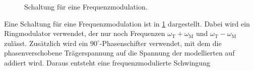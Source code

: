 \begin{figure}
	\centering
	\caption{Schaltung für eine Frequenzmodulation.\cite{V59}\label{fig:Schaltung_Frequenzmodlation}}
\end{figure}
Eine Schaltung für eine Frequenzmodulation ist in \cref{fig:Schaltung_Frequenzmodlation} dargestellt.
Dabei wird ein Ringmodulator verwendet, der nur noch Frequenzen $\omega_\text{T}+\omega_\text{M}$ und $\omega_\text{T}-\omega_\text{M}$ zulässt.
Zusätzlich wird ein $90^\circ$-Phasenschifter verwendet, mit dem die phasenverschobene Trägerspannung auf die Spannung der modellierten auf addiert wird.
Daraus entsteht eine frequenzmodulierte Schwingung

\newpage

